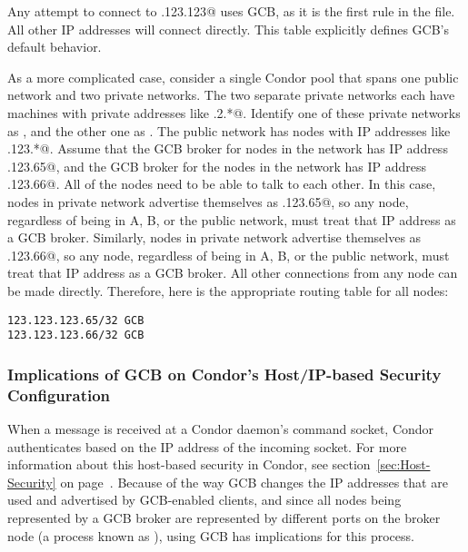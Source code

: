 Any attempt to connect to .123.123@ uses GCB,
as it is the first rule in the file.
All other IP addresses
will connect directly.
This table explicitly defines GCB's default behavior.


As a more complicated case, consider a single Condor pool that
spans one public network and two private networks.
The two separate private networks each have machines
with private addresses like .2.*@.
Identify one of these private networks as \verb@A@, and the other one
as \verb@B@. 
The public network has nodes with IP addresses like
.123.*@.
Assume that the GCB broker for nodes in the \verb@A@ network 
has IP address
.123.65@,
and the GCB broker for the nodes in the \verb@B@ network
has IP address
.123.66@.
All of the nodes need to be able to talk to each other.
In this case, nodes in private network \verb@A@ advertise
themselves as .123.65@, so any node, regardless of being
in A, B, or the public network, must treat that IP address as a GCB broker.
Similarly, nodes in private network \verb@B@ advertise 
themselves as .123.66@, so any node, regardless of being
in A, B, or the public network, must treat that IP address as a GCB broker.
All other connections from any node can be made directly.
Therefore, here is the appropriate routing table for all nodes:

\begin{verbatim}
123.123.123.65/32 GCB
123.123.123.66/32 GCB
\end{verbatim}


\subsubsection{\label{sec:GCB-host-security-implications}Implications
of GCB on Condor's Host/IP-based Security Configuration} 

When a message is received at a Condor daemon's command socket,
Condor authenticates based on the IP
address of the incoming socket.
For more information about this host-based security in Condor, see
section~\ref{sec:Host-Security} on page~\pageref{sec:Host-Security}.
Because of the way GCB changes the IP addresses that are used and
advertised by GCB-enabled clients, and since all nodes being
represented by a GCB broker are represented by different ports on the
broker node (a process known as ), using GCB has
implications for this process.

